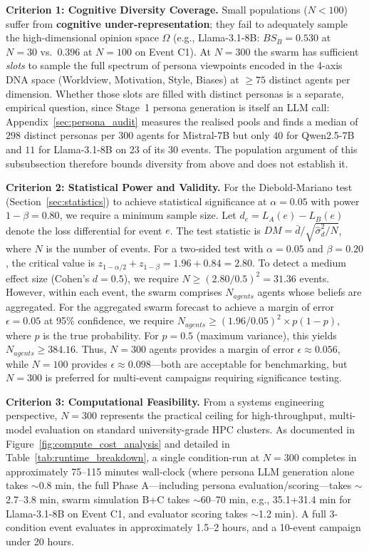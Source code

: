 \documentclass[11pt,journal,onecolumn]{IEEEtran}
\begin{document}
\textbf{Criterion 1: Cognitive Diversity Coverage.}
Small populations ($N < 100$) suffer from \textbf{cognitive under-representation}; they fail to adequately sample the high-dimensional opinion space $\Omega$ (e.g., Llama-3.1-8B: $BS_B = 0.530$ at $N=30$ vs.~$0.396$ at $N=100$ on Event C1). At $N=300$ the swarm has sufficient \emph{slots} to sample the full spectrum of persona viewpoints encoded in the 4-axis DNA space (Worldview, Motivation, Style, Biases) at $\geq 75$ distinct agents per dimension. Whether those slots are filled with distinct personas is a separate, empirical question, since Stage~1 persona generation is itself an LLM call: Appendix~\ref{sec:persona_audit} measures the realised pools and finds a median of $298$ distinct personas per $300$ agents for Mistral-7B but only $40$ for Qwen2.5-7B and $11$ for Llama-3.1-8B on 23 of its 30 events. The population argument of this subsubsection therefore bounds diversity from above and does not establish it.

\textbf{Criterion 2: Statistical Power and Validity.}
For the Diebold-Mariano test (Section~\ref{sec:statistics}) to achieve statistical significance at $\alpha=0.05$ with power $1-\beta=0.80$, we require a minimum sample size. Let $d_e = L_A(e) - L_B(e)$ denote the loss differential for event $e$. The test statistic is $DM = \bar{d} / \sqrt{\hat{\sigma}_d^2 / N}$, where $N$ is the number of events. For a two-sided test with $\alpha=0.05$ and $\beta=0.20$, the critical value is $z_{1-\alpha/2} + z_{1-\beta} = 1.96 + 0.84 = 2.80$. To detect a medium effect size (Cohen's $d = 0.5$), we require $N \geq (2.80 / 0.5)^2 = 31.36$ events. However, within each event, the swarm comprises $N_{agents}$ agents whose beliefs are aggregated. For the aggregated swarm forecast to achieve a margin of error $\epsilon = 0.05$ at 95\% confidence, we require $N_{agents} \geq (1.96 / 0.05)^2 \times p(1-p)$, where $p$ is the true probability. For $p=0.5$ (maximum variance), this yields $N_{agents} \geq 384.16$. Thus, $N=300$ agents provides a margin of error $\epsilon \approx 0.056$, while $N=100$ provides $\epsilon \approx 0.098$---both are acceptable for benchmarking, but $N=300$ is preferred for multi-event campaigns requiring significance testing.

\textbf{Criterion 3: Computational Feasibility.}
From a systems engineering perspective, $N=300$ represents the practical ceiling for high-throughput, multi-model evaluation on standard university-grade HPC clusters. As documented in Figure~\ref{fig:compute_cost_analysis} and detailed in Table~\ref{tab:runtime_breakdown}, a single condition-run at $N=300$ completes in approximately 75--115 minutes wall-clock (where persona LLM generation alone takes $\sim$0.8 min, the full Phase A---including persona evaluation/scoring---takes $\sim$2.7--3.8 min, swarm simulation B+C takes $\sim$60--70 min, e.g., 35.1+31.4 min for Llama-3.1-8B on Event C1, and evaluator scoring takes $\sim$1.2 min). A full 3-condition event evaluates in approximately 1.5--2 hours, and a 10-event campaign under 20 hours.
\end{document}
